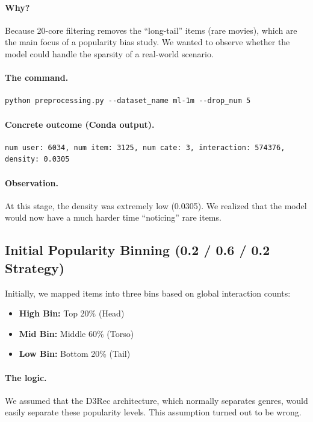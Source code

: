 \documentclass[11pt,a4paper]{article}
\begin{document}
\paragraph{Why?}
Because 20-core filtering removes the ``long-tail'' items (rare movies), which are the main focus of a popularity bias study. We wanted to observe whether the model could handle the sparsity of a real-world scenario.

\paragraph{The command.}
\begin{lstlisting}[style=bash]
python preprocessing.py --dataset_name ml-1m --drop_num 5
\end{lstlisting}

\paragraph{Concrete outcome (Conda output).}
\begin{lstlisting}[style=textout]
num user: 6034, num item: 3125, num cate: 3, interaction: 574376, density: 0.0305
\end{lstlisting}

\paragraph{Observation.}
At this stage, the density was extremely low (0.0305). We realized that the model would now have a much harder time ``noticing'' rare items.

\subsection{Initial Popularity Binning (0.2 / 0.6 / 0.2 Strategy)}
Initially, we mapped items into three bins based on global interaction counts:
\begin{itemize}[leftmargin=1.4em]
  \item \textbf{High Bin:} Top 20\% (Head)
  \item \textbf{Mid Bin:} Middle 60\% (Torso)
  \item \textbf{Low Bin:} Bottom 20\% (Tail)
\end{itemize}

\paragraph{The logic.}
We assumed that the D3Rec architecture, which normally separates genres, would easily separate these popularity levels. This assumption turned out to be wrong.
\end{document}
